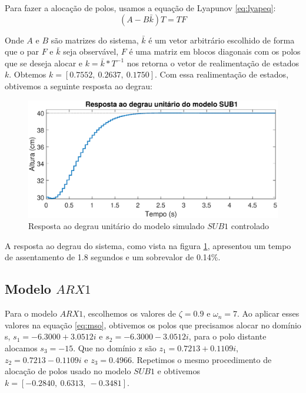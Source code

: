 Para fazer a alocação de polos, usamos a equação de Lyapunov
\eqref{eq:lyapeq}:
\begin{equation}\label{eq:lyapeq}
(A-B\bar{k})T=TF
\end{equation}

Onde $A$ e $B$ são matrizes do sistema, $\bar{k}$ é um vetor arbitrário escolhido de forma que o par $F$ e $\bar{k}$ seja observável, $F$ é uma matriz em blocos diagonais com os polos que se deseja alocar e $k=\bar{k}*T^{-1}$ nos retorna o vetor de realimentação de estados $k$. Obtemos $k=[0.7552,~0.2637,~0.1750]$. Com essa realimentação de estados, obtivemos a seguinte resposta ao degrau:

\begin{figure}[H]
	\centering
	\includegraphics[width=1\linewidth]{respostadegrausub1c}
	\caption[Resposta ao degrau unitário do modelo $SUB1$ controlado]{Resposta ao degrau unitário do modelo simulado $SUB1$ controlado}
	\label{fig:respostadegrausub1c}
\end{figure}


A resposta ao degrau do sistema, como vista na figura \ref{fig:respostadegrausub1c}, apresentou um tempo de assentamento de 1.8 segundos e um sobrevalor de 0.14\%.

\subsection{Modelo $ARX1$}\label{s:ctrlarx1}

Para o modelo $ARX1$, escolhemos os valores de $\zeta=0.9$ e $\omega_n=7$. Ao aplicar esses valores na equação \eqref{eq:mso}, obtivemos os polos que precisamos alocar no domínio s, $s_1=-6.3000 + 3.0512i$ e $s_2=-6.3000 - 3.0512i$, para o polo distante alocamos $s_3=-15$. Que no domínio z são $z_1=0.7213 + 0.1109i$, $z_2=0.7213 - 0.1109i$ e $z_3=0.4966$. Repetimos o mesmo procedimento de alocação de polos usado no modelo $SUB1$ e obtivemos $k=[-0.2840,~0.6313,~-0.3481]$.


